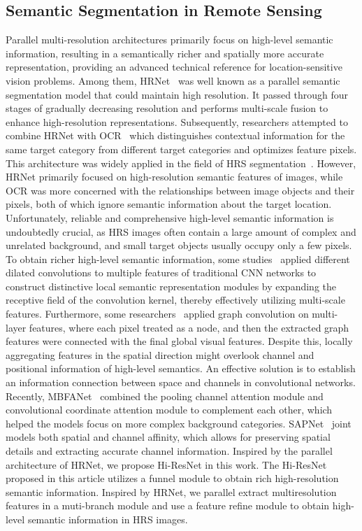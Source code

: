 \documentclass[journal]{IEEEtran}
\begin{document}
\subsection{Semantic Segmentation in Remote Sensing}
Parallel multi-resolution architectures primarily focus on high-level semantic information, resulting in a semantically richer and spatially more accurate representation, providing an advanced technical reference for location-sensitive vision problems. Among them, HRNet~\cite{wang2020deep} was well known as a parallel semantic segmentation model that could maintain high resolution. It passed through four stages of gradually decreasing resolution and performs multi-scale fusion to enhance high-resolution representations. Subsequently, researchers attempted to combine HRNet with OCR~\cite{yuan2019segmentation} which distinguishes contextual information for the same target category from different target categories and optimizes feature pixels. This architecture was widely applied in the field of HRS segmentation~\cite{yin2020optimised,niu2021hybrid,cheng2020remote,zhang2020multi,chen2023lite,wang2022detection}. However, HRNet primarily focused on high-resolution semantic features of images, while OCR was more concerned with the relationships between image objects and their pixels, both of which ignore semantic information about the target location. Unfortunately, reliable and comprehensive high-level semantic information is undoubtedly crucial, as HRS images often contain a large amount of complex and unrelated background, and small target objects usually occupy only a few pixels. To obtain richer high-level semantic information, some studies~\cite{hamaguchi2018effective,bi2021local,li2020dmnet,liu2020dense} applied different dilated convolutions to multiple features of traditional CNN networks to construct distinctive local semantic representation modules by expanding the receptive field of the convolution kernel, thereby effectively utilizing multi-scale features. Furthermore, some researchers~\cite{cai2020remote,chaudhuri2019siamese,zhou2021split,xu2021deep} applied graph convolution on multi-layer features, where each pixel treated as a node, and then the extracted graph features were connected with the final global visual features. Despite this, locally aggregating features in the spatial direction might overlook channel and positional information of high-level semantics. An effective solution is to establish an information connection between space and channels in convolutional networks. Recently, MBFANet~\cite{shi2023remote} combined the pooling channel attention module and convolutional coordinate attention module to complement each other, which helped the models focus on more complex background categories. 
SAPNet~\cite{zheng2022sapnet} joint models both spatial and channel affinity, which allows for preserving spatial details and extracting accurate channel information. 
Inspired by the parallel architecture of HRNet, we propose Hi-ResNet in this work. The Hi-ResNet proposed in this article utilizes a funnel module to obtain rich high-resolution semantic information. Inspired by HRNet, we parallel extract multiresolution features in a muti-branch module and use a feature refine module to obtain high-level semantic information in HRS images.
\end{document}
